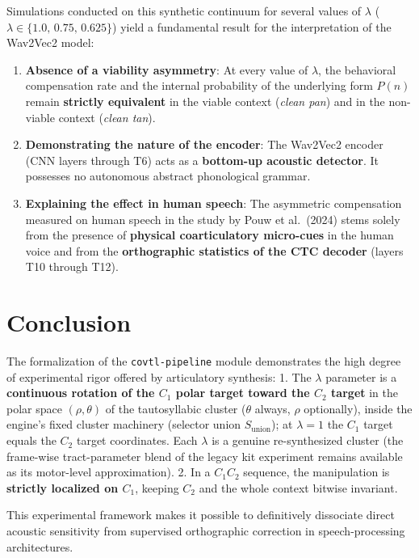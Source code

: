 \documentclass[11pt,a4paper]{article}
\begin{document}
Simulations conducted on this synthetic continuum for several values of $\lambda$ ($\lambda \in \{1.0,\, 0.75,\, 0.625\}$) yield a fundamental result for the interpretation of the Wav2Vec2 model:

\begin{enumerate}[leftmargin=*]
    \item \textbf{Absence of a viability asymmetry}: At every value of $\lambda$, the behavioral compensation rate and the internal probability of the underlying form $P(n)$ remain \textbf{strictly equivalent} in the viable context (\textit{clean pan}) and in the non-viable context (\textit{clean tan}).
    \item \textbf{Demonstrating the nature of the encoder}: The Wav2Vec2 encoder (CNN layers through T6) acts as a \textbf{bottom-up acoustic detector}. It possesses no autonomous abstract phonological grammar.
    \item \textbf{Explaining the effect in human speech}: The asymmetric compensation measured on human speech in the study by Pouw et al.\ (2024) stems solely from the presence of \textbf{physical coarticulatory micro-cues} in the human voice and from the \textbf{orthographic statistics of the CTC decoder} (layers T10 through T12).
\end{enumerate}

\section{Conclusion}

The formalization of the \texttt{covtl-pipeline} module demonstrates the high degree of experimental rigor offered by articulatory synthesis:
1. The $\lambda$ parameter is a \textbf{continuous rotation of the $C_1$ polar target toward the $C_2$ target} in the polar space $(\rho, \theta)$ of the tautosyllabic cluster ($\theta$ always, $\rho$ optionally), inside the engine's fixed cluster machinery (selector union $S_{\text{union}}$); at $\lambda = 1$ the $C_1$ target equals the $C_2$ target coordinates. Each $\lambda$ is a genuine re-synthesized cluster (the frame-wise tract-parameter blend of the legacy kit experiment remains available as its motor-level approximation).
2. In a $C_1 C_2$ sequence, the manipulation is \textbf{strictly localized on $C_1$}, keeping $C_2$ and the whole context bitwise invariant.

This experimental framework makes it possible to definitively dissociate direct acoustic sensitivity from supervised orthographic correction in speech-processing architectures.
\end{document}
